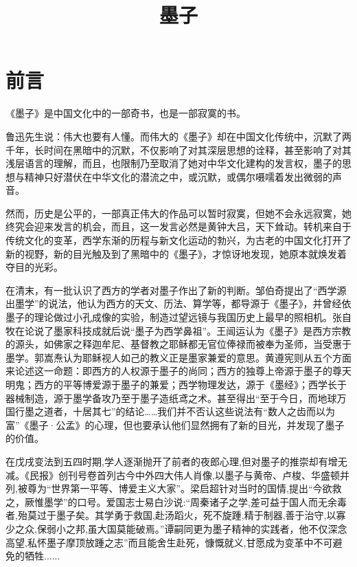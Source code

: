 \documentclass[12pt,UTF8]{ctexbook}
\title{\heiti\zihao{0} 墨子}
\author{}
\date{}
\begin{document}
\maketitle
\tableofcontents

\frontmatter
\chapter{前言}

《墨子》是中国文化中的一部奇书，也是一部寂寞的书。

鲁迅先生说：伟大也要有人懂。而伟大的《墨子》却在中国文化传统中，沉默了两千年，长时间在黑暗中的沉默，不仅影响了对其深层思想的诠释，甚至影响了对其浅层语言的理解，而且，也限制乃至取消了她对中华文化建构的发言权，墨子的思想与精神只好潜伏在中华文化的潜流之中，或沉默，或偶尔嗫嚅着发出微弱的声音。

然而，历史是公平的，一部真正伟大的作品可以暂时寂寞，但她不会永远寂寞，她终究会迎来发言的机会，而且，这一发言必然是黄钟大吕，天下耸动。转机来自于传统文化的变革，西学东渐的历程与新文化运动的勃兴，为古老的中国文化打开了新的视野，新的目光触及到了黑暗中的《墨子》，才惊讶地发现，她原本就焕发着夺目的光彩。

在清末，有一批认识了西方的学者对墨子作出了新的判断。邹伯奇提出了“西学源出墨学”的说法，他认为西方的天文、历法、算学等，都导源于《墨子》，并曾经依墨子的理论做过小孔成像的实验，制造过望远镜与我国历史上最早的照相机。张自牧在论说了墨家科技成就后说“墨子为西学鼻祖”。王闿运认为《墨子》是西方宗教的源头，如佛家之释迦牟尼、基督教之耶稣都无官位俸禄而被奉为圣师，当受惠于墨学。郭嵩焘认为耶稣视人如己的教义正是墨家兼爱的意思。黄遵宪则从五个方面来论述这一命题：即西方的人权源于墨子的尚同；西方的独尊上帝源于墨子的尊天明鬼；西方的平等博爱源于墨子的兼爱；西学物理发达，源于《墨经》；西学长于器械制造，源于墨学备攻乃至于墨子造纸鸢之术。甚至得出“至于今日，而地球万国行墨之道者，十居其七”的结论……我们并不否认这些说法有“数人之齿而以为富”《墨子·公孟》的心理，但也要承认他们显然拥有了新的目光，并发现了墨子的价值。

在戊戌变法到五四时期,学人逐渐抛开了前者的夜郎心理,但对墨子的推崇却有增无减。《民报》创刊号卷首列古今中外四大伟人肖像,以墨子与黄帝、卢梭、华盛顿并列,被尊为“世界第一平等、博爱主义大家”。梁启超针对当时的国情,提出“今欲救之，厥惟墨学”的口号。爱国志士易白沙说:“周秦诸子之学,差可益于国人而无余毒者,殆莫过于墨子矣。其学勇于救国,赴汤蹈火，死不旋踵,精于制器,善于治守,以寡少之众,保弱小之邦,虽大国莫能破焉。”谭嗣同更为墨子精神的实践者，他不仅深念高望,私怀墨子摩顶放踵之志”而且能舍生赴死，慷慨就义,甘愿成为变革中不可避免的牺牲......
\end{document}
